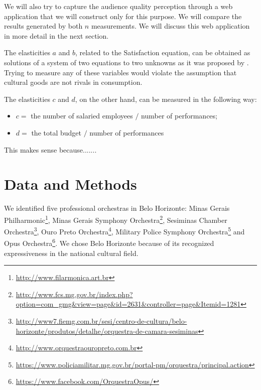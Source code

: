 \documentclass[a4paper, 12pt, openright, oneside, german, french, brazil, english]{abntex2}
\begin{document}
        We will also try to capture the audience quality perception through a web application that we will construct only for this purpose. We will compare the results generated by both $n$ measurements. We will discuss this web application in more detail in the next section.

        The elasticities $a$ and $b$, related to the Satisfaction equation, can be obtained as solutions of a system of two equations to two unknowns as it was proposed by . Trying to measure any of these variables would violate the assumption that cultural goods are not rivals in consumption.

        The elasticities $c$ and $d$, on the other hand, can be measured in the following way:

        \begin{itemize}
        \item $c =$ the number of salaried employees $/$ number of performances;
        \item $d =$ the total budget $/$ number of performances
        \end{itemize}

        This makes sense because....... %
	
	\chapter{Data and Methods}
	
	
	
	We identified five professional orchestras in Belo Horizonte: Minas Gerais Philharmonic\footnote{\url{http://www.filarmonica.art.br}}, Minas Gerais Symphony Orchestra\footnote{\url{http://www.fcs.mg.gov.br/index.php?option=com_gmg&view=page&id=2631&controller=page&Itemid=1281}}, Sesiminas Chamber Orchestra\footnote{\url{http://www7.fiemg.com.br/sesi/centro-de-cultura/belo-horizonte/produtos/detalhe/orquestra-de-camara-sesiminas}}, Ouro Preto Orchestra\footnote{\url{http://www.orquestraouropreto.com.br}}, Military Police Symphony Orchestra\footnote{\url{https://www.policiamilitar.mg.gov.br/portal-pm/orquestra/principal.action}} and Opus Orchestra\footnote{\url{https://www.facebook.com/OrquestraOpus/}}. We chose	Belo Horizonte because of its recognized expressiveness in the national cultural field.
	
\end{document}
